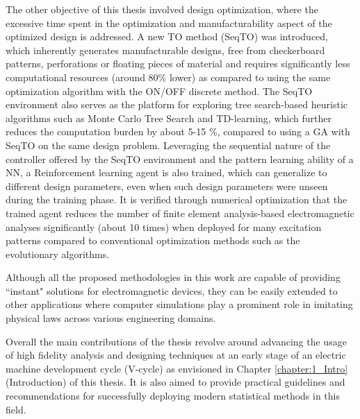 The other objective of this thesis involved design optimization, where the excessive time spent in the optimization and manufacturability aspect of the optimized design is addressed. A new TO method (SeqTO) was introduced, which inherently generates manufacturable designs, free from checkerboard patterns, perforations or floating pieces of material and requires significantly less computational resources (around 80\% lower) as compared to using the same optimization algorithm with the ON/OFF discrete method. The SeqTO environment also serves as the platform for exploring tree search-based heuristic algorithms such as Monte Carlo Tree Search and TD-learning, which further reduces the computation burden by about 5-15 \%, compared to using a GA with SeqTO on the same design problem. Leveraging the sequential nature of the controller offered by the SeqTO environment and the pattern learning ability of a NN, a Reinforcement learning agent is also trained, which can generalize to different design parameters, even when such design parameters were unseen during the training phase. It is verified through numerical optimization that the trained agent reduces the number of finite element analysis-based electromagnetic analyses significantly (about 10 times) when deployed for many excitation patterns compared to conventional optimization methods such as the evolutionary algorithms.

Although all the proposed methodologies in this work are capable of providing ``instant" solutions for electromagnetic devices, they can be easily extended to other applications where computer simulations play a prominent role in imitating physical laws across various engineering domains.

Overall the main contributions of the thesis revolve around advancing the usage of high fidelity analysis and designing techniques at an early stage of an electric machine development cycle (V-cycle) as envisioned in Chapter \ref{chapter:1_Intro} (Introduction) of this thesis. It is also aimed to provide practical guidelines and recommendations for successfully deploying modern statistical methods in this field. 

